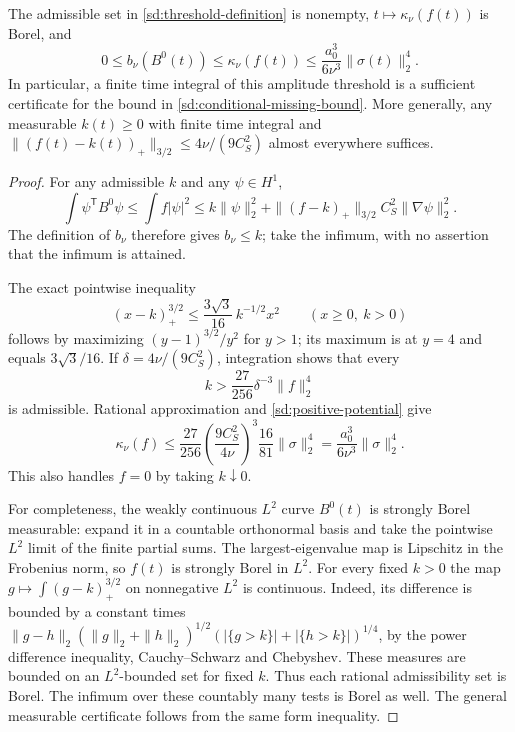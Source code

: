 \begin{proposition}
\label{sd:tail}
The admissible set in \eqref{sd:threshold-definition} is nonempty,
$t\mapsto\kappa_\nu(f(t))$ is Borel, and
\begin{equation}\label{sd:tail-chain}
 0\le b_\nu(B^0(t))\le\kappa_\nu(f(t))
 \le\frac{a_0^3}{6\nu^3}\|\sigma(t)\|_2^4.
\end{equation}
In particular, a finite time integral of this amplitude threshold is a
sufficient certificate for the bound in
\eqref{sd:conditional-missing-bound}. More generally, any measurable
$k(t)\ge0$ with finite time integral and
$\|(f(t)-k(t))_+\|_{3/2}\le4\nu/(9C_S^2)$ almost everywhere suffices.
\end{proposition}
\begin{proof}
For any admissible $k$ and any $\psi\in H^1$,
\[
 \int\psi^{\mathsf T}B^0\psi\le\int f|\psi|^2
 \le k\|\psi\|_2^2+\|(f-k)_+\|_{3/2}C_S^2\|\nabla\psi\|_2^2.
\]
The definition of $b_\nu$ therefore gives $b_\nu\le k$; take the
infimum, with no assertion that the infimum is attained.

The exact pointwise inequality
\begin{equation}\label{sd:truncation}
 (x-k)_+^{3/2}\le\frac{3\sqrt3}{16}\,k^{-1/2}x^2
 \qquad(x\ge0,\ k>0)
\end{equation}
follows by maximizing $(y-1)^{3/2}/y^2$ for $y>1$; its maximum is at
$y=4$ and equals $3\sqrt3/16$. If
$\delta=4\nu/(9C_S^2)$, integration shows that every
\[
 k>\frac{27}{256}\delta^{-3}\|f\|_2^4
\]
is admissible. Rational approximation and
\eqref{sd:positive-potential} give
\[
 \kappa_\nu(f)\le\frac{27}{256}
 \left(\frac{9C_S^2}{4\nu}\right)^3\frac{16}{81}\|\sigma\|_2^4
 =\frac{a_0^3}{6\nu^3}\|\sigma\|_2^4.
\]
This also handles $f=0$ by taking $k\downarrow0$.

For completeness, the weakly continuous $L^2$ curve $B^0(t)$ is strongly
Borel measurable: expand it in a countable orthonormal basis and take the
pointwise $L^2$ limit of the finite partial sums. The largest-eigenvalue
map is Lipschitz in the Frobenius norm, so $f(t)$ is strongly Borel in
$L^2$. For every fixed $k>0$ the map
$g\mapsto\int(g-k)_+^{3/2}$ on nonnegative $L^2$ is continuous.
Indeed, its difference is bounded by a constant times
$\|g-h\|_2(\|g\|_2+\|h\|_2)^{1/2}
(|\{g>k\}|+|\{h>k\}|)^{1/4}$, by the power difference inequality,
Cauchy--Schwarz and Chebyshev. These measures are bounded on an
$L^2$-bounded set for fixed $k$. Thus each rational admissibility set is
Borel. The infimum over these countably many tests is Borel as well.
The general measurable certificate follows from the same form inequality.
\end{proof}

